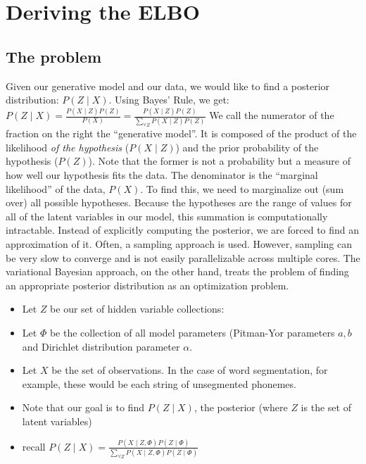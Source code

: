 
\section{Deriving the ELBO}
\label{append_a}
\subsection{The problem}

Given our generative model and our data, we would
like to find a posterior distribution: $P(Z \mid  X)$. Using
Bayes’ Rule, we get:
$P(Z\mid X) = \frac{P(X\mid Z)P(Z)}{P(X)} = \frac{P(X\mid Z)P(Z)}{\sum\limits_{\forall Z} P(X\mid Z) P(Z)}$
We call the numerator of the fraction on the right the “generative
model”. It is composed of the product of the likelihood \textit{of the
hypothesis} ($P(X\mid Z)$) and the prior probability of the hypothesis
($P(Z)$). Note that the former is not a probability but a measure of how
well our hypothesis fits the data. The denominator is the ``marginal
likelihood'' of the data, $P(X)$. To find this, we need to marginalize
out (sum over) all possible hypotheses. Because the hypotheses are the
range of values for all of the latent variables in our model, this
summation is computationally intractable. Instead of explicitly computing the posterior, we are forced to find an approximation of it. Often, a sampling approach is used. However, sampling can
be very slow to converge and is not easily parallelizable across
multiple cores. The variational Bayesian approach, on the other hand,
treats the problem of finding an appropriate posterior distribution as an
optimization problem.

 \begin{itemize}
\item   Let $Z$ be our set of hidden variable collections: 
\item   Let $\Phi$ be the collection of all model parameters (Pitman-Yor
    parameters $a,b$ and Dirichlet distribution parameter $\alpha$.
\item   Let $X$ be the set of observations. In the case of word
    segmentation, for example, these would be each string of unsegmented
    phonemes.
\item   Note that our goal is to find $P(Z\mid X)$, the posterior (where $Z$ is
    the set of latent variables)
\item  recall $P(Z\mid X) = \frac{P(X\mid Z, \Phi)P(Z \mid  \Phi)}{\sum\limits_{\forall Z} P(X\mid Z, \Phi) P(Z\mid \Phi) } $ 
\end{itemize}

